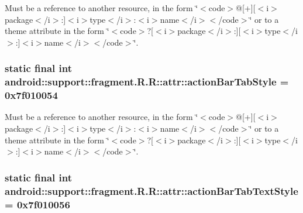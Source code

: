 Must be a reference to another resource, in the form \char`\"{}$<$code$>$@\mbox{[}+\mbox{]}\mbox{[}$<$i$>$package$<$/i$>$:\mbox{]}$<$i$>$type$<$/i$>$:$<$i$>$name$<$/i$>$$<$/code$>$\char`\"{} or to a theme attribute in the form \char`\"{}$<$code$>$?\mbox{[}$<$i$>$package$<$/i$>$:\mbox{]}\mbox{[}$<$i$>$type$<$/i$>$:\mbox{]}$<$i$>$name$<$/i$>$$<$/code$>$\char`\"{}. \hypertarget{classandroid_1_1support_1_1fragment_1_1_r_1_1attr_1b3e02713a7fca54abfe62d8a5d13361}{
\subsubsection[{actionBarTabStyle}]{\setlength{\rightskip}{0pt plus 5cm}static final int android::support::fragment.R.R::attr::actionBarTabStyle = 0x7f010054}}
\label{classandroid_1_1support_1_1fragment_1_1_r_1_1attr_1b3e02713a7fca54abfe62d8a5d13361}


Must be a reference to another resource, in the form \char`\"{}$<$code$>$@\mbox{[}+\mbox{]}\mbox{[}$<$i$>$package$<$/i$>$:\mbox{]}$<$i$>$type$<$/i$>$:$<$i$>$name$<$/i$>$$<$/code$>$\char`\"{} or to a theme attribute in the form \char`\"{}$<$code$>$?\mbox{[}$<$i$>$package$<$/i$>$:\mbox{]}\mbox{[}$<$i$>$type$<$/i$>$:\mbox{]}$<$i$>$name$<$/i$>$$<$/code$>$\char`\"{}. \hypertarget{classandroid_1_1support_1_1fragment_1_1_r_1_1attr_9d0ef7fd23688d45395eee8e835ebcea}{
\subsubsection[{actionBarTabTextStyle}]{\setlength{\rightskip}{0pt plus 5cm}static final int android::support::fragment.R.R::attr::actionBarTabTextStyle = 0x7f010056}}
\label{classandroid_1_1support_1_1fragment_1_1_r_1_1attr_9d0ef7fd23688d45395eee8e835ebcea}


